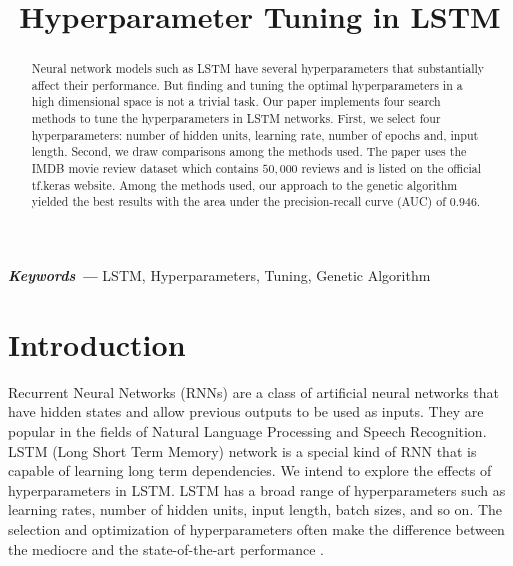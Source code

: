 \documentclass[conference]{IEEEtran}
\providecommand{\keywords}[1]{\textbf{\textit{Keywords ---}} #1}
\begin{document}
\title{Hyperparameter Tuning in LSTM }
\author{
}

\maketitle

\begin{abstract}
Neural network models such as LSTM have several hyperparameters that substantially affect their performance. But finding and tuning the optimal hyperparameters in a high dimensional space is not a trivial task. Our paper implements four search methods to tune the hyperparameters in LSTM networks. First, we select four hyperparameters: number of hidden units, learning rate, number of epochs and, input length. Second, we draw comparisons among the methods used. The paper uses the IMDB movie review dataset which contains $50,000$ reviews and is listed on the official tf.keras website. Among the methods used, our approach to the genetic algorithm yielded the best results with the area under the precision-recall curve (AUC) of $0.946$.
\end{abstract}

\keywords{LSTM, Hyperparameters, Tuning, Genetic Algorithm}
\section{Introduction}
Recurrent Neural Networks (RNNs) are a class of artificial neural networks that have hidden states and allow previous outputs to be used as inputs.
They are popular in the fields of Natural Language Processing and Speech Recognition. 
LSTM (Long Short Term Memory) network \cite{lstm} is a special kind of RNN that is capable of learning long term dependencies. 
We intend to explore the effects of hyperparameters in LSTM.
LSTM has a broad range of hyperparameters such as learning rates, number of hidden units, input length, batch sizes, and so on.
The selection and optimization of hyperparameters often make the difference between the mediocre and the state-of-the-art performance \cite{hutter}.
\end{document}
